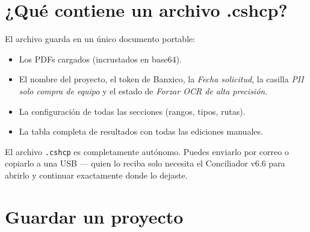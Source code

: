 \documentclass[12pt, a4paper, oneside]{report}
\newcommand{\btn}[1]{\texttt{\colorbox{vino!15}{\strut#1}}}
\begin{document}
\section{¿Qué contiene un archivo .cshcp?}

El archivo guarda en un único documento portable:

\begin{itemize}
  \item Los PDFs cargados (incrustados en base64).
  \item El nombre del proyecto, el token de Banxico, la \textit{Fecha solicitud},
        la casilla \textit{PII solo compra de equipo} y el estado de
        \textit{Forzar OCR de alta precisión}.
  \item La configuración de todas las secciones (rangos, tipos, rutas).
  \item La tabla completa de resultados con todas las ediciones manuales.
\end{itemize}

\begin{notabox}
El archivo \texttt{.cshcp} es completamente autónomo. Puedes enviarlo por
correo o copiarlo a una USB — quien lo reciba solo necesita el Conciliador
v6.6 para abrirlo y continuar exactamente donde lo dejaste.
\end{notabox}

\section{Guardar un proyecto}


\end{document}
